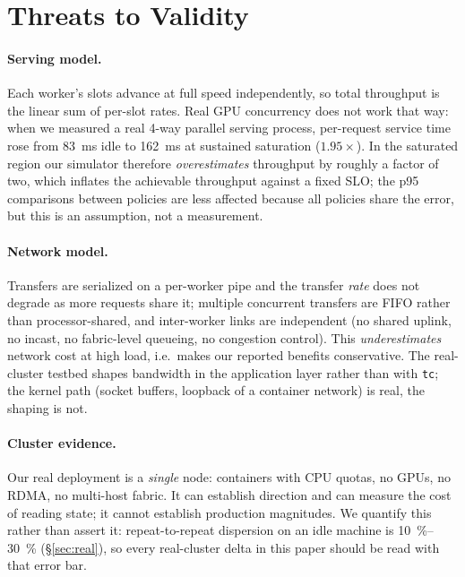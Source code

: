\section{Threats to Validity}
\label{sec:threats}

\paragraph{Serving model.} Each worker's slots advance at full speed independently, so total
throughput is the linear sum of per-slot rates. Real GPU concurrency does not work that way: when
we measured a real \num{4}-way parallel serving process, per-request service time rose from
\SI{83}{\milli\second} idle to \SI{162}{\milli\second} at sustained saturation ($1.95\times$).
In the saturated region our simulator therefore \emph{overestimates} throughput by roughly a
factor of two, which inflates the achievable throughput against a fixed SLO; the p95 comparisons
between policies are less affected because all policies share the error, but this is an
assumption, not a measurement.

\paragraph{Network model.} Transfers are serialized on a per-worker pipe and the transfer
\emph{rate} does not degrade as more requests share it; multiple concurrent transfers are FIFO
rather than processor-shared, and inter-worker links are independent (no shared uplink, no
incast, no fabric-level queueing, no congestion control). This \emph{underestimates} network cost
at high load, i.e.~makes our reported benefits conservative. The real-cluster testbed shapes
bandwidth in the application layer rather than with \texttt{tc}; the kernel path (socket buffers,
loopback of a container network) is real, the shaping is not.

\paragraph{Cluster evidence.} Our real deployment is a \emph{single} node: containers with CPU
quotas, no GPUs, no RDMA, no multi-host fabric. It can establish direction and can measure the
cost of reading state; it cannot establish production magnitudes. We quantify this rather than
assert it: repeat-to-repeat dispersion on an idle machine is \SIrange{10}{30}{\percent}
(\S\ref{sec:real}), so every real-cluster delta in this paper should be read with that error bar.

